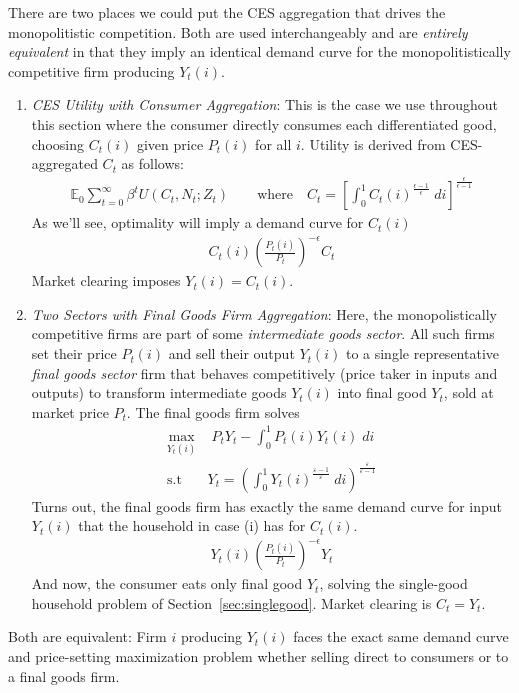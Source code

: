 \documentclass[12pt]{article}
\theoremstyle{plain}
\theoremstyle{definition}
\theoremstyle{remark}
\newcommand{\E}{\mathbb{E}}
\newcommand{\sumtinfz}{\sum^\infty_{t=0}}
\newcommand{\intzo}{\int_0^1}
\begin{document}
There are two places we could put the CES aggregation that drives the
monopolitistic competition. Both are used interchangeably and are
\emph{entirely equivalent} in that they imply an identical demand curve
for the monopolitistically competitive firm producing $Y_t(i)$.
\begin{enumerate}[label=(\roman*)]
  \item \emph{CES Utility with Consumer Aggregation}:
    This is the case we use throughout this section where the consumer
    directly consumes each differentiated good, choosing $C_t(i)$ given
    price $P_t(i)$ for all $i$.
    Utility is derived from CES-aggregated $C_t$ as follows:
    \begin{align*}
      \E_0\sumtinfz \beta^t U(C_t,N_t;Z_t)
      \qquad\text{where}\quad
      C_t =
      \left[ \int_0^1 C_t(i)^{\frac{\epsilon-1}{\epsilon}}\;di
      \right]^{\frac{\epsilon}{\epsilon-1}}
    \end{align*}
    As we'll see, optimality will imply a demand curve for $C_t(i)$
    \begin{align*}
      C_t(i)
      \left( \frac{P_t(i)}{P_t} \right)^{-\epsilon}
      C_t
    \end{align*}
    Market clearing imposes $Y_t(i)=C_t(i)$.

  \item \emph{Two Sectors with Final Goods Firm Aggregation}:
    Here, the monopolistically competitive firms are part of some
    \emph{intermediate goods sector}. All such firms set their price
    $P_t(i)$ and sell their output $Y_t(i)$ to a single representative
    \emph{final goods sector} firm that behaves competitively (price
    taker in inputs and outputs) to transform intermediate goods
    $Y_t(i)$ into final good $Y_t$, sold at market price $P_t$.  The
    final goods firm solves
    \begin{align*}
      \max_{Y_t(i)} &\; P_tY_t - \intzo P_t(i)Y_t(i)\;di \\
      \text{s.t}\quad &
      Y_t = \left(
        \intzo Y_t(i)^{\frac{\varepsilon-1}{\varepsilon}}
        \; di
      \right)^{\frac{\varepsilon}{\varepsilon-1}}
    \end{align*}
    Turns out, the final goods firm has exactly the same demand curve
    for input $Y_t(i)$ that the household in case (i) has for $C_t(i)$.
    \begin{align*}
      Y_t(i)
      \left( \frac{P_t(i)}{P_t} \right)^{-\epsilon}
      Y_t
    \end{align*}
    And now, the consumer eats only final good $Y_t$, solving the
    single-good household problem of Section~\ref{sec:singlegood}.
    Market clearing is $C_t=Y_t$.
\end{enumerate}
Both are equivalent: Firm $i$ producing $Y_t(i)$ faces the exact same
demand curve and price-setting maximization problem whether selling
direct to consumers or to a final goods firm.
\end{document}

